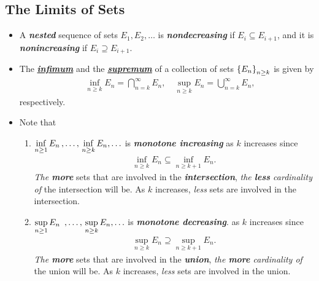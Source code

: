 \documentclass[11pt]{article}
\begin{document}
\subsection{The Limits of Sets}
\begin{itemize}
\item   \begin{definition}
A \emph{\textbf{nested}} sequence of sets $E_{1}, E_{2}, \ldots $ is \emph{\textbf{nondecreasing}} if $E_{i}\subseteq E_{i+1}$, and it is \emph{\textbf{nonincreasing}}  if $E_{i}\supseteq E_{i+1}$.
\end{definition}

\item \begin{definition}
The \underline{\emph{\textbf{infimum}}} and the \underline{\emph{\textbf{supremum}}} of a collection of sets $\left\{E_{n}\right\}_{n\ge k}$ is given by 
\begin{align*}
&\inf\limits_{n\ge k}E_{n} = \bigcap_{n= k}^{\infty}E_{n}, \quad \sup\limits_{n\ge k}E_{n} = \bigcup_{n= k}^{\infty}E_{n} ,
\end{align*}
respectively.
\end{definition}

\item \begin{remark} Note that
\begin{enumerate}
\item $\inf\limits_{n\ge 1}E_{n} \,{,}\ldots{,}\, \inf\limits_{n\ge k}E_{n} , \ldots $ is \emph{\textbf{monotone increasing}} as $k$ increases since 
\begin{align*}
\inf\limits_{n\ge k}E_{n} \subseteq \inf\limits_{n\ge k+1}E_{n}.
\end{align*} \emph{The \textbf{more}} sets that are involved in the \emph{\textbf{intersection}}, \emph{the \textbf{less} cardinality of} the intersection will be. As $k$ increases, \emph{less} sets are involved in the intersection. 
\item $\sup\limits_{n\ge 1}E_{n}\ \,{,}\ldots{,}\, \sup\limits_{n\ge k}E_{n} , \ldots $ is \emph{\textbf{monotone decreasing}}. as $k$ increases since 
\begin{align*}
\sup\limits_{n\ge k}E_{n} \supseteq \sup\limits_{n\ge k+1}E_{n}.
\end{align*} \emph{The \textbf{more}} sets that are involved in the \emph{\textbf{union}}, \emph{the \textbf{more} cardinality of} the union will be. As $k$ increases, \emph{less} sets are involved in the union. 
\end{enumerate}
\end{remark}


\end{itemize}
\end{document}
